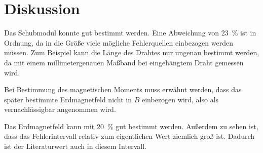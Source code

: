 \section{Diskussion}
\label{sec:Diskussion}

Das Schubmodul konnte gut bestimmt werden. Eine Abweichung von
\SI{23}{\percent} ist in Ordnung, da in die Größe viele mögliche
Fehlerquellen einbezogen werden müssen. Zum Beispiel kann die Länge des
Drahtes nur ungenau bestimmt werden, da mit einem millimetergenauen
Maßband bei eingehängtem Draht gemessen wird.

Bei Bestimmung des magnetischen Moments muss erwähnt werden, dass das
später bestimmte Erdmagnetfeld nicht in $B$ einbezogen wird, also
als vernachlässigbar angenommen wird.

Das Erdmagnetfeld kann mit \SI{20}{\percent} gut bestimmt werden.
Außerdem zu sehen ist, dass das Fehlerintervall relativ zum eigentlichen Wert
ziemlich groß ist. Dadurch ist der Literaturwert auch in diesem Intervall.
